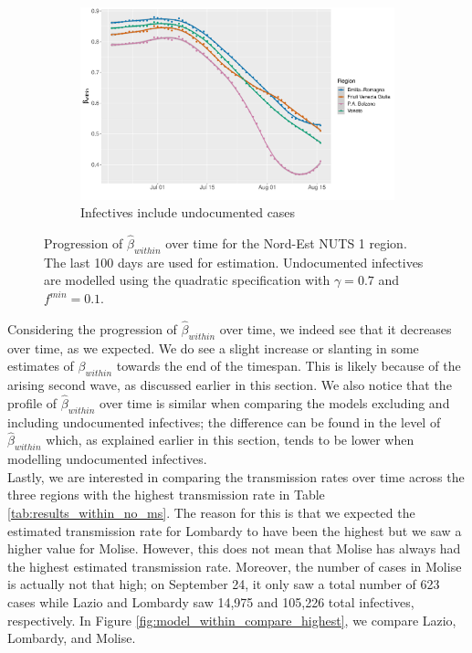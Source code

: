 \documentclass[12pt]{article}
\begin{document}
    \begin{figure}[H]\ContinuedFloat
	    \begin{subfigure}{\textwidth}
	      \centering
	      \includegraphics[width=0.94\linewidth]{output/model_within_lag14_betawithin_Nord-Est_UndocQuadratic_rolling.pdf}
	      \caption{Infectives include undocumented cases}
	      \label{fig:beta_within_over_time_nordest_regular_undoc}
	    \end{subfigure}
	    \caption{Progression of $\widehat{\beta}_{within}$ over time for the Nord-Est NUTS 1 region. The last 100 days are used for estimation. Undocumented infectives are modelled using the quadratic specification with $\gamma = 0.7$ and $f^{min}=0.1$.}
	    \label{fig:beta_within_over_time_nordest}
    \end{figure}
	
	Considering the progression of $\widehat{\beta}_{within}$ over time, we indeed see that it decreases over time, as we expected. We do see a slight increase or slanting in some estimates of $\beta_{within}$ towards the end of the timespan. This is likely because of the arising second wave, as discussed earlier in this section. We also notice that the profile of $\widehat{\beta}_{within}$ over time is similar when comparing the models excluding and including undocumented infectives; the difference can be found in the level of $\widehat{\beta}_{within}$ which, as explained earlier in this section, tends to be lower when modelling undocumented infectives. \\
	
	Lastly, we are interested in comparing the transmission rates over time across the three regions with the highest transmission rate in Table \ref{tab:results_within_no_ms}. The reason for this is that we expected the estimated transmission rate for Lombardy to have been the highest but we saw a higher value for Molise. However, this does not mean that Molise has always had the highest estimated transmission rate. Moreover, the number of cases in Molise is actually not that high; on September 24, it only saw a total number of 623 cases while Lazio and Lombardy saw 14,975 and 105,226 total infectives, respectively. In Figure \ref{fig:model_within_compare_highest}, we compare Lazio, Lombardy, and Molise.
	
\end{document}
